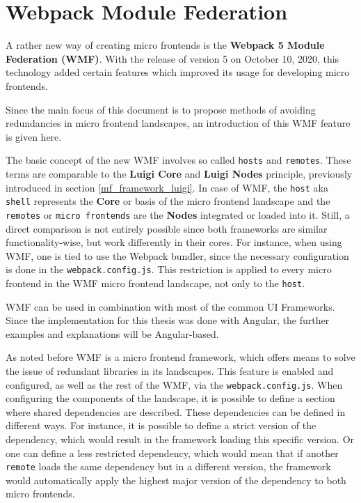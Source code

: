 \section{Webpack Module Federation}
\label{wmf_chap_2}

A rather new way of creating micro frontends is the \textbf{Webpack 5 Module Federation (WMF)}. With the release of version 5 on October 10, 2020, this technology added certain features which improved its usage for developing micro frontends.\cite{wmf_concepts}

Since the main focus of this document is to propose methods of avoiding redundancies in micro frontend landscapes, an introduction of this WMF feature is given here.

The basic concept of the new WMF involves so called \texttt{hosts} and \texttt{remotes}. These terms are comparable to the \textbf{Luigi Core} and \textbf{Luigi Nodes} principle, previously introduced in section \ref{mf_framework_luigi}. In case of WMF, the \texttt{host} aka \texttt{shell} represents the \textbf{Core} or basis of the micro frontend landscape and the \texttt{remotes} or \texttt{micro frontends} are the \textbf{Nodes} integrated or loaded into it. 
Still, a direct comparison is not entirely possible since both frameworks are similar functionality-wise, but work differently in their cores. For instance, when using WMF, one is tied to use the Webpack bundler, since the necessary configuration is done in the \texttt{webpack.config.js}. This restriction is applied to every micro frontend in the WMF micro frontend landscape, not only to the \texttt{host}.

WMF can be used in combination with most of the common UI Frameworks. Since the implementation for this thesis was done with Angular, the further examples and explanations will be Angular-based.

As noted before WMF is a micro frontend framework, which offers means to solve the issue of redundant libraries in its landscapes.
This feature is enabled and configured, as well as the rest of the WMF, via the \texttt{webpack.config.js}. When configuring the components of the landscape, it is possible to define a section where shared dependencies are described. These dependencies can be defined in different ways. For instance, it is possible to define a strict version of the dependency, which would result in the framework loading this specific version. Or one can define a less restricted dependency, which would mean that if another \texttt{remote} loads the same dependency but in a different version, the framework would automatically apply the highest major version of the dependency to both micro frontends.


